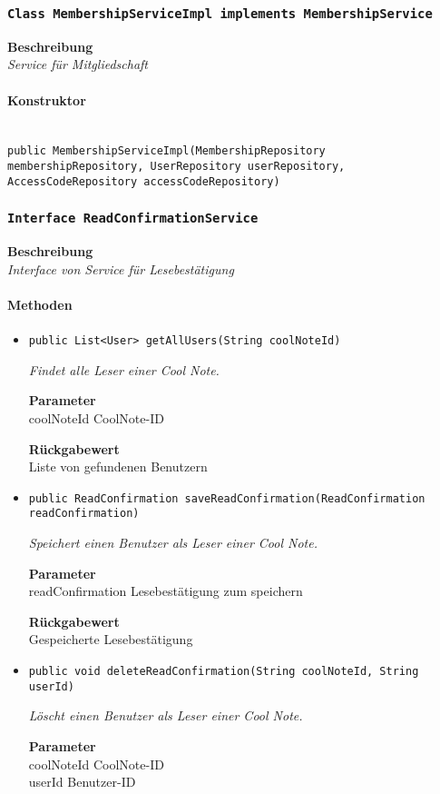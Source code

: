      \subsubsection{\texttt{Class MembershipServiceImpl implements MembershipService}}
     \textbf{Beschreibung} \\
     \textit{Service für Mitgliedschaft}
     \paragraph*{Konstruktor}\mbox{} \\
     \texttt{public MembershipServiceImpl(MembershipRepository membershipRepository, UserRepository userRepository, AccessCodeRepository accessCodeRepository)} \\
     \subsubsection{\texttt{Interface ReadConfirmationService}}
     \textbf{Beschreibung} \\
     \textit{Interface von Service für Lesebestätigung}
     \paragraph*{Methoden}
     \begin{itemize}
     	\item{\texttt{public List<User> getAllUsers(String coolNoteId)}}
     	
     	\textit{Findet alle Leser einer Cool Note.}
     	
     	\textbf{Parameter} \\
     	coolNoteId CoolNote-ID
     	
     	\textbf{Rückgabewert} \\
     	Liste von gefundenen Benutzern        \item{\texttt{public ReadConfirmation saveReadConfirmation(ReadConfirmation readConfirmation)}}
     	
     	\textit{Speichert einen Benutzer als Leser einer Cool Note.}
     	
     	\textbf{Parameter} \\
     	readConfirmation Lesebestätigung zum speichern
     	
     	\textbf{Rückgabewert} \\
     	Gespeicherte Lesebestätigung        \item{\texttt{public void deleteReadConfirmation(String coolNoteId, String userId)}}
     	
     	\textit{Löscht einen Benutzer als Leser einer Cool Note.}
     	
     	\textbf{Parameter} \\
     	coolNoteId CoolNote-ID\\
     	userId Benutzer-ID
     	
     	
     \end{itemize}
